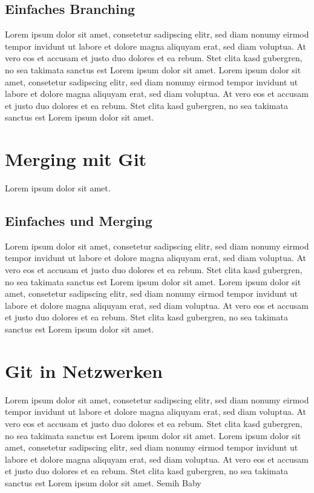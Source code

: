 \documentclass[12pt,a4paper,bibliography=totocnumbered,listof=totocnumbered]{scrartcl}
\begin{document}
\subsection{Einfaches Branching}
Lorem ipsum dolor sit amet, consetetur sadipscing elitr, sed diam nonumy eirmod tempor invidunt ut labore et dolore magna aliquyam erat, sed diam voluptua. At vero eos et accusam et justo duo dolores et ea rebum. Stet clita kasd gubergren, no sea takimata sanctus est Lorem ipsum dolor sit amet. Lorem ipsum dolor sit amet, consetetur sadipscing elitr, sed diam nonumy eirmod tempor invidunt ut labore et dolore magna aliquyam erat, sed diam voluptua. At vero eos et accusam et justo duo dolores et ea rebum. Stet clita kasd gubergren, no sea takimata sanctus est Lorem ipsum dolor sit amet.
\pagebreak

\section{Merging mit Git}
Lorem ipsum dolor sit amet.

\subsection{Einfaches und Merging}
Lorem ipsum dolor sit amet, consetetur sadipscing elitr, sed diam nonumy eirmod tempor invidunt ut labore et dolore magna aliquyam erat, sed diam voluptua. At vero eos et accusam et justo duo dolores et ea rebum. Stet clita kasd gubergren, no sea takimata sanctus est Lorem ipsum dolor sit amet. Lorem ipsum dolor sit amet, consetetur sadipscing elitr, sed diam nonumy eirmod tempor invidunt ut labore et dolore magna aliquyam erat, sed diam voluptua. At vero eos et accusam et justo duo dolores et ea rebum. Stet clita kasd gubergren, no sea takimata sanctus est Lorem ipsum dolor sit amet.
\pagebreak
\section{Git in Netzwerken}
Lorem ipsum dolor sit amet, consetetur sadipscing elitr, sed diam nonumy eirmod tempor invidunt ut labore et dolore magna aliquyam erat, sed diam voluptua. At vero eos et accusam et justo duo dolores et ea rebum. Stet clita kasd gubergren, no sea takimata sanctus est Lorem ipsum dolor sit amet. Lorem ipsum dolor sit amet, consetetur sadipscing elitr, sed diam nonumy eirmod tempor invidunt ut labore et dolore magna aliquyam erat, sed diam voluptua. At vero eos et accusam et justo duo dolores et ea rebum. Stet clita kasd gubergren, no sea takimata sanctus est Lorem ipsum dolor sit amet. Semih Baby
\end{document}
